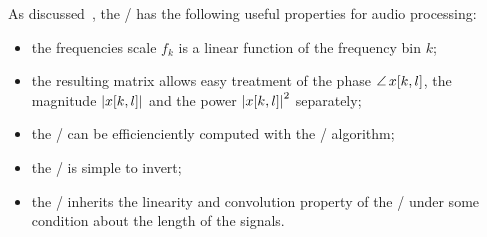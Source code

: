 As discussed~, the \STFT/ has the following useful properties for audio processing:
\begin{itemize}
    \item the frequencies scale $f_k$ is a linear function of the frequency bin $k$;
    \item the resulting matrix allows easy treatment of the phase $\operatorname*{\angle}{x[k,l]}$, the magnitude $\magnitudeOf{x[k,l]}$ and the power $\powerOf{x[k,l]}$ separately;
    \item the \DFT/ can be efficienciently computed with the \FFT/ algorithm;
    \item the \STFT/ is simple to invert;
    \item the \STFT/ inherits the linearity and convolution property of the \DFT/ under some condition about the length of the signals.
\end{itemize}

